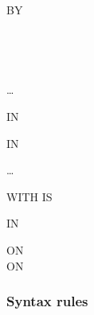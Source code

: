 \begin{syntax}
  \begin{1=}
    \identifier \\
    \miscext{\literal}
  \end{1=}

  \begin{0-1}
     BY
    \begin{0-1}
    \end{0-1}
    \begin{1=}
      \identifier \\
      \literal
    \end{1=}
    \begin{1=}
      \begin{0-1}
      \end{0-1}
      \begin{1=}
        \identifier \\
        \literal
      \end{1=}
    \end{1=} \ldots
  \end{0-1}

  \begin{1=}
    \identifier
    \begin{0-1}
       IN \identifier
    \end{0-1}
    \begin{0-1}
       IN \identifier
    \end{0-1}
  \end{1=} \ldots

  \begin{0-1}
    WITH  IS \identifier
  \end{0-1}

  \begin{0-1}
     IN \identifier
  \end{0-1}

  \begin{0+}
    ON  \imperativestatement \\
     ON  \imperativestatement
  \end{0+}

  \begin{0-1}
  \end{0-1}
\end{syntax}

\subsubsection{Syntax rules}

